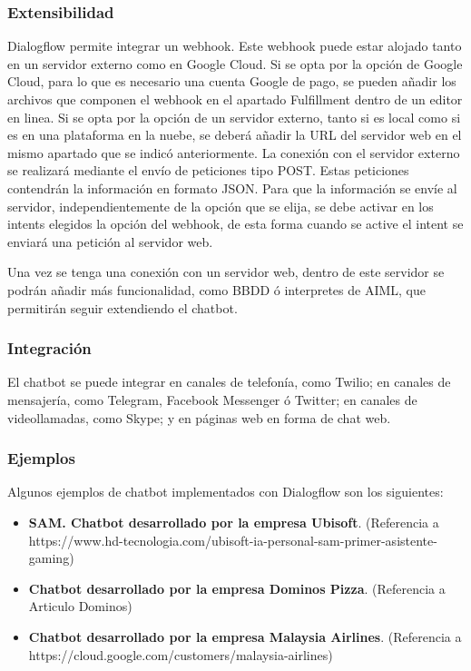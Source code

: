 \subsubsection*{Extensibilidad}

Dialogflow permite integrar un webhook. Este webhook puede estar alojado tanto en un servidor externo como en Google Cloud. Si se opta por la opción de Google Cloud, para lo que es necesario una cuenta Google de pago, se pueden añadir los archivos que componen el webhook en el apartado Fulfillment dentro de un editor en linea. Si se opta por la opción de un servidor externo, tanto si es local como si es en una plataforma en la nuebe, se deberá añadir la URL del servidor web en el mismo apartado que se indicó anteriormente. La conexión con el servidor externo se realizará mediante el envío de peticiones tipo POST. Estas peticiones contendrán la información en formato JSON. Para que la información se envíe al servidor, independientemente de la opción que se elija, se debe activar en los intents elegidos la opción del webhook, de esta forma cuando se active el intent se enviará una petición al servidor web.

Una vez se tenga una conexión con un servidor web, dentro de este servidor se podrán añadir más funcionalidad, como BBDD ó interpretes de AIML, que permitirán seguir extendiendo el chatbot.

\subsubsection*{Integración}

El chatbot se puede integrar en canales de telefonía, como Twilio; en canales de mensajería, como Telegram, Facebook Messenger ó Twitter; en canales de videollamadas, como Skype; y en páginas web en forma de chat web.

\subsubsection*{Ejemplos}

Algunos ejemplos de chatbot implementados con Dialogflow son los siguientes:

\begin{itemize}
    \item \textbf{SAM. Chatbot desarrollado por la empresa Ubisoft}. (Referencia a https://www.hd-tecnologia.com/ubisoft-ia-personal-sam-primer-asistente-gaming)
    \item \textbf{Chatbot desarrollado por la empresa Dominos Pizza}. (Referencia a Articulo Dominos)
    \item \textbf{Chatbot desarrollado por la empresa Malaysia Airlines}. (Referencia a https://cloud.google.com/customers/malaysia-airlines)
\end{itemize}



